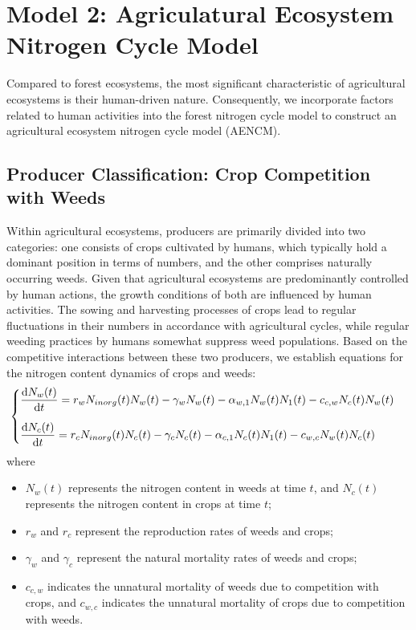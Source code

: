 \documentclass{mcmthesis}
\begin{document}
\section{Model 2: Agriculatural Ecosystem Nitrogen Cycle Model}
Compared to forest ecosystems, the most significant characteristic of agricultural ecosystems is their human-driven nature. Consequently, we incorporate factors related to human activities into the forest nitrogen cycle model to construct an agricultural ecosystem nitrogen cycle model (AENCM).
\subsection{Producer Classification: Crop Competition with Weeds}
\label{sec:5_1}
Within agricultural ecosystems, producers are primarily divided into two categories: one consists of crops cultivated by humans, which typically hold a dominant position in terms of numbers, and the other comprises naturally occurring weeds. Given that agricultural ecosystems are predominantly controlled by human actions, the growth conditions of both are influenced by human activities. The sowing and harvesting processes of crops lead to regular fluctuations in their numbers in accordance with agricultural cycles, while regular weeding practices by humans somewhat suppress weed populations. Based on the competitive interactions between these two producers, we establish equations for the nitrogen content dynamics of crops and weeds:
\begin{align}
\label{eq:model2_competition}
    \begin{cases}
	\displaystyle \vspace{10pt}
    \frac{\mathrm{d}N_{w}(t)}{\mathrm{d}t}=r_{w}N_{inorg}(t)N_{w}(t)-\gamma _{w}N_{w}(t)-\alpha _{w,1}N_{w}(t)N_1(t)-c_{c,w}N_{c}(t)N_{w}(t)  \\
    \displaystyle
	\frac{\mathrm{d}N_{c}(t)}{\mathrm{d}t}=r_{c}N_{inorg}(t)N_{c}(t)-\gamma _{c}N_{c}(t)-\alpha _{c,1}N_{c}(t)N_1(t)-c_{w,c}N_{w}(t)N_{c}(t)
\end{cases}
\end{align}
where
\begin{itemize}
    \item $N_w(t)$ represents the nitrogen content in weeds at time $t$, and $N_c(t)$ represents the nitrogen content in crops at time $t$;
    \item $r_w$ and $r_c$ represent the reproduction rates of weeds and crops;
    \item $\gamma_w$ and $\gamma_c$ represent the natural mortality rates of weeds and crops;
    \item $c_{c,w}$ indicates the unnatural mortality of weeds due to competition with crops, and $c_{w,c}$ indicates the unnatural mortality of crops due to competition with weeds.
\end{itemize}
\end{document}
